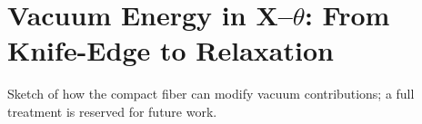 \section{Vacuum Energy in X--\texorpdfstring{$\theta$}{theta}: From Knife-Edge to Relaxation}\label{sec:vacuum-energy}
Sketch of how the compact fiber can modify vacuum contributions; a full treatment is reserved for future work.
